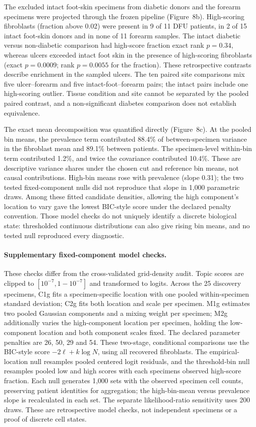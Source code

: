 \documentclass[10pt,a4paper]{article}
\begin{document}
The excluded intact foot-skin specimens from diabetic donors and the forearm specimens were projected through the frozen pipeline (Figure~8b). High-scoring fibroblasts (fraction above 0.02) were present in 9 of 11 DFU patients, in 2 of 15 intact foot-skin donors and in none of 11 forearm samples. The intact diabetic versus non-diabetic comparison had high-score fraction exact rank $p=0.34$, whereas ulcers exceeded intact foot skin in the presence of high-scoring fibroblasts (exact $p=0.0009$; rank $p=0.0055$ for the fraction). These retrospective contrasts describe enrichment in the sampled ulcers. The ten paired site comparisons mix five ulcer--forearm and five intact-foot--forearm pairs; the intact pairs include one high-scoring outlier. Tissue condition and site cannot be separated by the pooled paired contrast, and a non-significant diabetes comparison does not establish equivalence.

The exact mean decomposition was quantified directly (Figure~8c). At the pooled bin means, the prevalence term contributed 88.4\% of between-specimen variance in the fibroblast mean and 89.1\% between patients. The specimen-level within-bin term contributed 1.2\%, and twice the covariance contributed 10.4\%. These are descriptive variance shares under the chosen cut and reference bin means, not causal contributions. High-bin means rose with prevalence (slope 0.31); the two tested fixed-component nulls did not reproduce that slope in 1,000 parametric draws. Among these fitted candidate densities, allowing the high component's location to vary gave the lowest BIC-style score under the declared penalty convention. Those model checks do not uniquely identify a discrete biological state: thresholded continuous distributions can also give rising bin means, and no tested null reproduced every diagnostic.

\paragraph{Supplementary fixed-component model checks.} These checks differ from the cross-validated grid-density audit. Topic scores are clipped to $[10^{-7},1-10^{-7}]$ and transformed to logits. Across the 25 discovery specimens, C1g fits a specimen-specific location with one pooled within-specimen standard deviation; C2g fits both location and scale per specimen. M1g estimates two pooled Gaussian components and a mixing weight per specimen; M2g additionally varies the high-component location per specimen, holding the low-component location and both component scales fixed. The declared parameter penalties are 26, 50, 29 and 54. These two-stage, conditional comparisons use the BIC-style score $-2\ell+k\log N$, using all recovered fibroblasts. The empirical-location null resamples pooled centered logit residuals, and the threshold-bin null resamples pooled low and high scores with each specimen\textquotesingle{}s observed high-score fraction. Each null generates 1,000 sets with the observed specimen cell counts, preserving patient identities for aggregation; the high-bin-mean versus prevalence slope is recalculated in each set. The separate likelihood-ratio sensitivity uses 200 draws. These are retrospective model checks, not independent specimens or a proof of discrete cell states.
\end{document}
